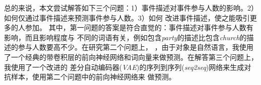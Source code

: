 \documentclass[12pt]{template}
\begin{document}
\par{
    总的来说，本文尝试解答如下三个问题：1）事件描述对事件参与人数的影响。2）如何仅通过事件描述来预测事件参与人数。3）如何
    改进事件描述，使之能吸引更多的人参加。 其中，第一问题的答案是符合直觉的：事件描述对事件参与人数有影响，而且影响程度与
    不同的词语有关，例如包含\textit{party}的描述比包含\textit{church}的描述的参与人数要高不少。在研究第二个问题上，
    ，由于对象是自然语言，我使用了一个经典的带卷积层的前向神经网络和词向量来做预测。在解答第三个问题上，我使用了一个改进的
    差分自动编码器(\textit{VAE})的序列到序列(\textit{seq2seq})网络来生成对抗样本，使用第二个问题中的前向神经网络来
    做预测。
}
\end{document}
